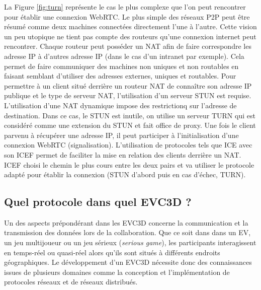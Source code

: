 La Figure \ref{fig:turn} représente le cas le plus complexe que l'on peut 
rencontrer pour établir une connexion WebRTC. Le plus simple des réseaux P2P 
peut être résumé comme deux machines connectées directement l'une à l'autre. 
Cette vision un peu utopique ne tient pas compte des routeurs qu'une connexion 
internet peut rencontrer. 
Chaque routeur peut posséder un \gls{NAT} afin de faire correspondre 
les adresse IP à d'autres adresse IP (dans le cas d'un intranet par exemple). 
Cela permet de faire communiquer des machines non uniques et non routables en 
faisant semblant d'utiliser des adresses externes, uniques et routables. 
Pour permettre à un client situé derrière un routeur \gls{NAT} de connaître son 
adresse IP publique et le type de serveur \gls{NAT}, l'utilisation d'un serveur 
\gls{STUN} est requise. 
L'utilisation d'une \gls{NAT} dynamique impose des restrictionq sur l'adresse de  
destination. Dans ce cas, le \gls{STUN} est inutile, on utilise un serveur 
\gls{TURN} qui est considéré comme une extension du \gls{STUN} et fait office de 
proxy. 
Une fois le client parvenu à récupérer une adresse IP, il peut participer à 
l'initialisation d'une connexion WebRTC (signalisation). L'utilisation de protocoles 
tels que \gls{ICE} avec son \gls{ICEF} permet de faciliter la mise en relation des 
clients derrière un \gls{NAT}. \gls{ICEF} choisi le chemin le plus cours entre les 
deux pairs et va utiliser le protocole adapté pour établir la connexion (\gls{STUN} 
d'abord puis en cas d'échec, \gls{TURN}).



\subsection{Quel protocole dans quel EVC3D ?}
Un des aspects prépondérant dans les \gls{EVC3D} concerne la communication et 
la transmission des données lors de la collaboration. Que ce soit dans dans un 
\gls{EV}, un jeu multijoueur ou un jeu sérieux (\textit{serious game}), les 
participants interagissent en temps-réel ou quasi-réel alors qu'ils sont situés à 
différents endroits géographiques. 
Le développement d'un \gls{EVC3D} nécessite donc des connaissances issues de 
plusieurs domaines comme la conception et l'implémentation de protocoles 
réseaux et de réseaux distribués.

